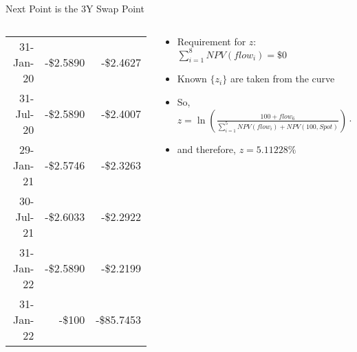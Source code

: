 \documentclass[handout, aspectratio=169]{beamer}
\begin{document}
\begin{frame}{Next Point is the 3Y Swap Point}
\begin{columns}[T]
\begin{column}{0.3\textwidth}
{\begin{table}[t]
\begin{adjustbox}{max width=.85\textwidth, max height=\textheight}
\begin{tabular}{|r|r|r|}
							31-Jan-20 & -\$2.5890 & -\$2.4627 \\
							31-Jul-20 & -\$2.5890 & -\$2.4007 \\
							29-Jan-21 & -\$2.5746 & -\$2.3263 \\
							30-Jul-21 & -\$2.6033 & -\$2.2922 \\
							31-Jan-22 & -\$2.5890 & -\$2.2199 \\
							31-Jan-22 & -\$100 & -\$85.7453 \\ 
							\hline
						\end{tabular}
					\end{adjustbox}
				\end{table}
			}
		\end{column}
		
		\begin{column}{0.7\textwidth}
			\small
			\begin{itemize}
				\item Requirement for $z$: $\sum_{i=1}^{8} NPV(flow_i) = \$0$
				\item Known $\{z_i\}$ are taken from the curve
				\item So, $z = \ln(\frac{100+flow_6}{\sum_{i=1}^{5} NPV(flow_i)+NPV(100, Spot)}) \cdot \frac{365}{1098}$
				\item and therefore, $z = 5.11228\%$
			\end{itemize}
	\end{column}
	\end{columns}
\end{frame}
\end{document}
